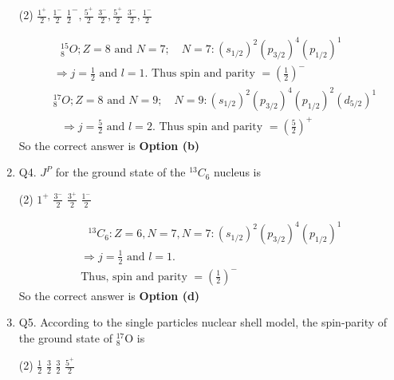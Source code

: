 \begin{enumerate}
	{}
	\begin{tasks}(2)
		\task[\textbf{a.}]$\frac{1^{+}}{2}, \frac{1^{-}}{2}$
		\task[\textbf{b.}] $\frac{1}{2}^{-}, \frac{5^{+}}{2}$
		\task[\textbf{c.}]$\frac{3^{-}}{2}, \frac{5^{+}}{2}$
		\task[\textbf{d.}] $\frac{3^{-}}{2}, \frac{1^{-}}{2}$
	\end{tasks}
	\begin{answer}
		\begin{align*}
		&\text{ ${ }_8^{15} O ; Z=8$ and $N=7 ; \quad N=7:\left(s_{1 / 2}\right)^2\left(p_{3 / 2}\right)^4\left(p_{1 / 2}\right)^1$ }\\
		&\text{$\Rightarrow j=\frac{1}{2}$ and $l=1$. Thus spin and parity $=\left(\frac{1}{2}\right)^{-}$ }\\
		&\text{${ }_8^{17} O ; Z=8$ and $N=9 ; \quad N=9:\left(s_{1 / 2}\right)^2\left(p_{3 / 2}\right)^4\left(p_{1 / 2}\right)^2\left(d_{5 / 2}\right)^1$} \\
		&\text{ $\Rightarrow j=\frac{5}{2}$ and $l=2$. Thus spin and parity $=\left(\frac{5}{2}\right)^{+}$}
		\end{align*}
		So the correct answer is \textbf{Option (b)}
	\end{answer}
	\item Q4. $J^P$ for the ground state of the ${ }^{13} C_6$ nucleus is
	{}
	\begin{tasks}(2)
		\task[\textbf{a.}]$1^{+}$
		\task[\textbf{b.}]$\frac{3^{-}}{2}$
		\task[\textbf{c.}]$\frac{3^{+}}{2}$
		\task[\textbf{d.}]$\frac{1^{-}}{2}$ 
	\end{tasks}
	\begin{answer}
		\begin{align*}
		&\text{ ${ }^{13} C_6: Z=6, N=7, N=7:\left(s_{1 / 2}\right)^2\left(p_{3 / 2}\right)^4\left(p_{1 / 2}\right)^1$ }\\
		&\text{$\Rightarrow j=\frac{1}{2}$ and $l=1$.}\\
		&\text{Thus, spin and parity $=\left(\frac{1}{2}\right)^{-}$}
		\end{align*}
		So the correct answer is \textbf{Option (d)}
	\end{answer}
	\item Q5. According to the single particles nuclear shell model, the spin-parity of the ground state of ${ }_8^{17} \mathrm{O}$ is
	{}
	\begin{tasks}(2)
		\task[\textbf{a.}]$\frac{1}{2}$
		\task[\textbf{b.}]$\frac{3}{2}$
		\task[\textbf{c.}]$\frac{3}{2}$
		\task[\textbf{d.}]$\frac{5^{+}}{2}$ 

\end{tasks}
\end{enumerate}
